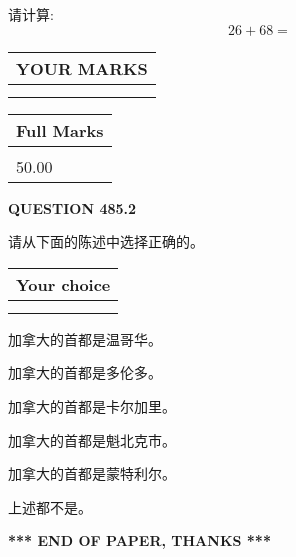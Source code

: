 \documentclass{ctexart}
\begin{document}
  
 
请计算:
\begin{equation}
26 +  %
68 = \nonumber
\end{equation}
 

 

 
  
\vspace{0.2in}
  
\noindent\begin{tabular}{|l|}
\hline
 YOUR MARKS  \\
\hline
 \\ 
 \\ 
\hline
\end{tabular}
\hspace{0.05in} \begin{tabular}{|l|}
\hline
 Full Marks  \\
\hline
 \\ 
50.00 \\
\hline
\end{tabular}
{\textbf{\Large{QUESTION
485.2 
}}}
  
  
请从下面的陈述中选择正确的。
  
  
\noindent\hspace{3.0in} \begin{tabular}{|l|}
\hline
Your choice \\
\hline
 \\ 
 \\ 
\hline
\end{tabular}
  
  
 
 
加拿大的首都是温哥华。
 
 
加拿大的首都是多伦多。
 
 
加拿大的首都是卡尔加里。
 
 
加拿大的首都是魁北克市。
 
 
加拿大的首都是蒙特利尔。
 
 
 上述都不是。
 
 
   
   
 \vspace{0.2in}
 
   
   
   
   
\vspace{1.0in} 
{\textbf{\large{ *** END OF PAPER, THANKS *** }}} 
   
\end{document}
